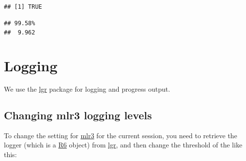 \documentclass[]{scrbook}
\newenvironment{Shaded}{\begin{snugshade}}{\end{snugshade}}
\newcommand{\DecValTok}[1]{\textcolor[rgb]{0.00,0.00,0.81}{#1}}
\newcommand{\KeywordTok}[1]{\textcolor[rgb]{0.13,0.29,0.53}{\textbf{#1}}}
\newcommand{\NormalTok}[1]{#1}
\newcommand{\OperatorTok}[1]{\textcolor[rgb]{0.81,0.36,0.00}{\textbf{#1}}}
\newcommand{\StringTok}[1]{\textcolor[rgb]{0.31,0.60,0.02}{#1}}
\renewenvironment{Shaded} {\begin{snugshade}\small} {\end{snugshade}}
\begin{document}
\begin{Shaded}
\end{Shaded}

\begin{verbatim}
## [1] TRUE
\end{verbatim}

\begin{Shaded}
\end{Shaded}

\begin{verbatim}
## 99.58% 
##  9.962
\end{verbatim}

\hypertarget{logging}{%
\section{Logging}\label{logging}}

We use the \href{https://cran.r-project.org/package=lgr}{lgr} package for logging and progress output.

\hypertarget{changing-mlr3-logging-levels}{%
\subsection{Changing mlr3 logging levels}\label{changing-mlr3-logging-levels}}

To change the setting for \href{https://mlr3.mlr-org.com}{mlr3} for the current session, you need to retrieve the logger (which is a \href{https://cran.r-project.org/package=R6}{R6} object) from \href{https://cran.r-project.org/package=lgr}{lgr}, and then change the threshold of the like this:

\begin{Shaded}
\end{Shaded}
\end{document}

